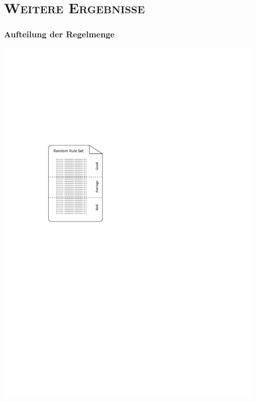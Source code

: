 \documentclass[xcolor=x11names,compress]{beamer}
\renewcommand{\(}{\begin{columns}}
\renewcommand{\)}{\end{columns}}
\newcommand{\<}[1]{\begin{column}{#1}}
\renewcommand{\>}{\end{column}}
\begin{document}
\section{\scshape Weitere Ergebnisse}
\begin{frame}[noframenumbering]
  \frametitle{Aufteilung der Regelmenge}
  \centering\includegraphics[height=0.9\textheight]{figures/rule-thirds}
\end{frame}
\end{document}
